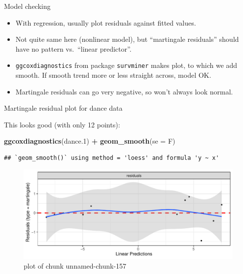 \documentclass[ignorenonframetext,]{beamer}
\newenvironment{Shaded}{\begin{snugshade}}{\end{snugshade}}
\newcommand{\DataTypeTok}[1]{\textcolor[rgb]{0.13,0.29,0.53}{#1}}
\newcommand{\FloatTok}[1]{\textcolor[rgb]{0.00,0.00,0.81}{#1}}
\newcommand{\KeywordTok}[1]{\textcolor[rgb]{0.13,0.29,0.53}{\textbf{#1}}}
\newcommand{\NormalTok}[1]{#1}
\newcommand{\OperatorTok}[1]{\textcolor[rgb]{0.81,0.36,0.00}{\textbf{#1}}}
\newcommand{\StringTok}[1]{\textcolor[rgb]{0.31,0.60,0.02}{#1}}
\begin{document}
\begin{frame}[fragile]{Model checking}
\protect\hypertarget{model-checking}{}

\begin{itemize}
\item
  With regression, usually plot residuals against fitted values.
\item
  Not quite same here (nonlinear model), but ``martingale residuals''
  should have no pattern vs.~``linear predictor''.
\item
  \texttt{ggcoxdiagnostics} from package \texttt{survminer} makes plot,
  to which we add smooth. If smooth trend more or less straight across,
  model OK.
\item
  Martingale residuals can go very negative, so won't always look
  normal.
\end{itemize}

\end{frame}

\begin{frame}[fragile]{Martingale residual plot for dance data}
\protect\hypertarget{martingale-residual-plot-for-dance-data}{}

This looks good (with only 12 points):

\begin{Shaded}
\begin{Highlighting}[]
\KeywordTok{ggcoxdiagnostics}\NormalTok{(dance}\FloatTok{.1}\NormalTok{) }\OperatorTok{+}\StringTok{ }\KeywordTok{geom_smooth}\NormalTok{(}\DataTypeTok{se =}\NormalTok{ F)}
\end{Highlighting}
\end{Shaded}

\begin{verbatim}
## `geom_smooth()` using method = 'loess' and formula 'y ~ x'
\end{verbatim}

\begin{figure}
\centering
\includegraphics{figure/unnamed-chunk-157-1.pdf}
\caption{plot of chunk unnamed-chunk-157}
\end{figure}

\end{frame}
\end{document}
